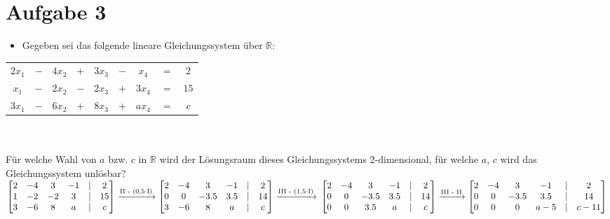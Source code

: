\section*{Aufgabe 3}

\begin{itemize}[leftmargin=*, label={a)}]
\item Gegeben sei das folgende lineare Gleichungssystem über $\mathbb{R}$:
\end{itemize}

\begin{tabular}{ccccccccc}
$2x_1$ & $-$ & $4x_2$ & $+$ & $3x_3$ & $-$ & $x_4$ & $=$ & $2$\\ 
$x_1$ & $-$ & $2x_2$ & $-$ & $2x_3$ & $+$ & $3x_4$ & $=$ & $15$\\
$3x_1$ & $-$ & $6x_2$ & $+$ & $8x_3$ & $+$ & $ax_4$ & $=$ & $c$
\end{tabular}\\~\\

Für welche Wahl von $a$ bzw. $c$ in $\mathbb{R}$ wird der Lösungsraum dieses Gleichungssystems 2-dimensional, für welche $a$, $c$ wird das Gleichungssystem unlösbar?\\

$
\begin{bmatrix}
2 & -4 & 3 & -1 & | & 2\\
1 & -2 & -2 & 3 & | & 15\\
3 & -6 & 8 & a & | & c\\
\end{bmatrix}
\xrightarrow{\text{II - (0,5} \cdot \text{I)}}
\begin{bmatrix}
2 & -4 & 3 & -1 & | & 2\\
0 & 0 & -3.5 & 3.5 & | & 14\\
3 & -6 & 8 & a & | & c\\
\end{bmatrix}
\xrightarrow{\text{III - (1.5} \cdot \text{I)}}\\~\\~\\
\begin{bmatrix}
2 & -4 & 3 & -1 & | & 2\\
0 & 0 & -3.5 & 3.5 & | & 14\\
0 & 0 & 3.5 & a & | & c\\
\end{bmatrix}
\xrightarrow{\text{III - II}}
\begin{bmatrix}
2 & -4 & 3 & -1 & | & 2\\
0 & 0 & -3.5 & 3.5 & | & 14\\
0 & 0 & 0 & a-5 & | & c-11\\
\end{bmatrix}
$\\~\\

